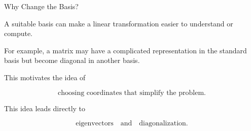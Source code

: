 \begin{frame}{Why Change the Basis?}

A suitable basis can make a linear transformation easier
to understand or compute.

For example, a matrix may have a complicated representation
in the standard basis but become diagonal in another basis.

\vspace{0.4cm}

This motivates the idea of

\[
\boxed{
\text{choosing coordinates that simplify the problem}.
}
\]

\vspace{0.4cm}

This idea leads directly to

\[
\boxed{
\text{eigenvectors}
\quad\text{and}\quad
\text{diagonalization}.
}
\]

\end{frame}